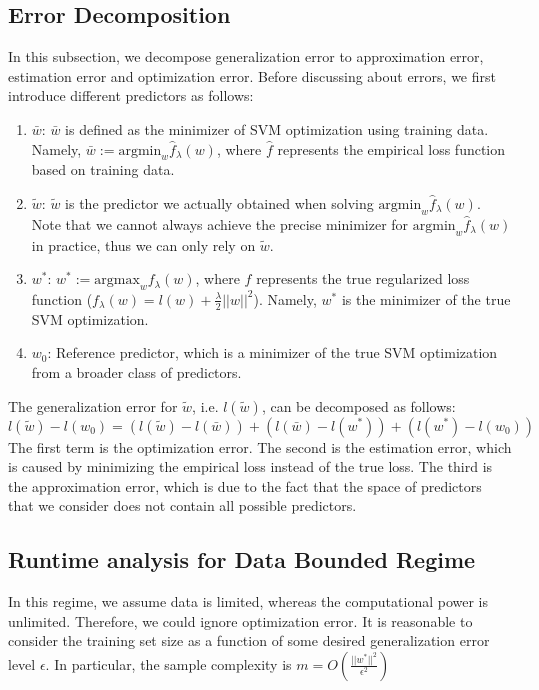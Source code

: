 \documentclass[11pt,a4paper]{article}
\begin{document}
\subsection{Error Decomposition}

In this subsection, we decompose generalization error to approximation error, estimation error and optimization error. Before discussing about errors, we first introduce different predictors as follows:
\begin{enumerate}
\item $\bar{w}$: $\bar{w}$ is defined as the minimizer of SVM optimization using training data. Namely, $\bar{w}:=\mbox{argmin}_w \hat{f}_{\lambda}(w)$, where $\hat{f}$ represents the empirical loss function based on training data. 
\item $\tilde{w}$: $\tilde{w}$ is the predictor we actually obtained when solving $\mbox{argmin}_w \hat{f}_{\lambda}(w)$. Note that we cannot always achieve the precise minimizer for $\mbox{argmin}_w \hat{f}_{\lambda}(w)$ in practice, thus we can only rely on $\tilde{w}$.
\item $w^{*}$: $w^{*}:=\mbox{argmax}_w f_{\lambda}(w)$, where $f$ represents the true regularized loss function ($f_{\lambda}(w)=l(w)+\frac{\lambda}{2}||w||^2$). Namely, $w^{*}$ is the minimizer of the true SVM optimization.
\item $w_0$: Reference predictor, which is a minimizer of the true SVM optimization from a broader class of predictors.
\end{enumerate}
The generalization error for $\tilde{w}$, i.e. $l(\tilde{w})$, can be decomposed as follows:
\begin{equation}
l(\tilde{w})-l(w_0)=(l(\tilde{w})-l(\bar{w}))+(l(\bar{w})-l(w^{*}))+(l(w^{*})-l(w_0))
\end{equation}
The first term is the optimization error. The second is the estimation error, which is caused by minimizing the empirical loss instead of the true loss. The third is the approximation error, which is due to the fact that the space of predictors that we consider does not contain all possible predictors.

\subsection{Runtime analysis for Data Bounded Regime}

In this regime, we assume data is limited, whereas the computational power is unlimited. Therefore, we could ignore optimization error. It is reasonable to consider the training set size as a function of some desired generalization error level $\epsilon$. In particular, the sample complexity is $m=O(\frac{||w^{*}||^2}{\epsilon^2})$
\end{document}
